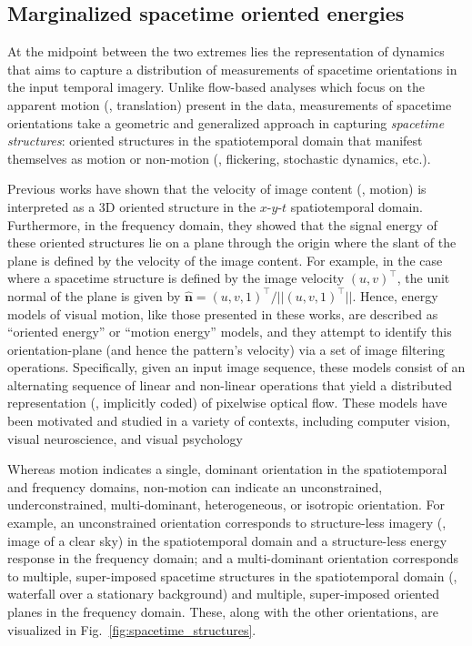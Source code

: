 \subsection{Marginalized spacetime oriented energies}
\label{sec:msoe}

At the midpoint between the two extremes lies the representation of dynamics that aims to capture a distribution of measurements of spacetime orientations in the input temporal imagery.
Unlike flow-based analyses which focus on the apparent motion (\ie, translation) present in the data, measurements of spacetime orientations take a geometric and generalized approach in capturing \emph{spacetime structures}: oriented structures in the spatiotemporal domain that manifest themselves as motion or non-motion (\eg, flickering, stochastic dynamics, etc.).

Previous works \cite{adelson1985spatiotemporal,fahle1981,heeger1988,simoncelli1998,watson1983,nishimoto2011,derpanis2012spacetime} have shown that the velocity of image content (\ie, motion) is interpreted as a 3D oriented structure in the $x$-$y$-$t$ spatiotemporal domain. Furthermore, in the frequency domain, they showed that the signal energy of these oriented structures lie on a plane through the origin where the slant of the plane is defined by the velocity of the image content.
For example, in the case where a spacetime structure is defined by the image velocity $(u, v)^\top$, the unit normal of the plane is given by $\hat{\mathbf{n}}=(u, v, 1)^\top / ||(u, v, 1)^\top||$.
Hence, energy models of visual motion, like those presented in these works, are described as ``oriented energy'' or ``motion energy'' models, and they attempt to identify this orientation-plane (and hence the pattern's velocity) via a set of image filtering operations. Specifically, given an input image sequence, these models consist of an alternating sequence of linear and non-linear operations that yield a distributed representation (\ie,  implicitly coded) of pixelwise
optical flow. These models have been motivated and studied in a variety of contexts, including computer vision, visual neuroscience, and visual psychology

Whereas motion indicates a single, dominant orientation in the spatiotemporal and frequency domains, non-motion can indicate an unconstrained, underconstrained, multi-dominant, heterogeneous, or isotropic orientation. For example, an unconstrained orientation corresponds to structure-less imagery (\eg, image of a clear sky) in the spatiotemporal domain and a structure-less energy response in the frequency domain; and a multi-dominant orientation corresponds to multiple, super-imposed spacetime structures in the spatiotemporal domain (\eg, waterfall over a stationary background) and multiple, super-imposed oriented planes in the frequency domain. These, along with the other orientations, are visualized in Fig.\ \ref{fig:spacetime_structures}.
\clearpage

\clearpage

